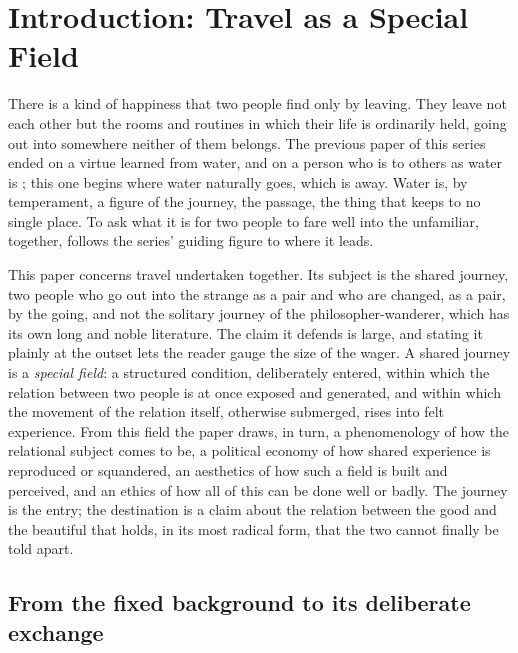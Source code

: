 \section{Introduction: Travel as a Special Field}
\label{p21:sec:intro}

\noindent
There is a kind of happiness that two people find only by leaving. They leave not each other but the rooms and routines in which their life is ordinarily held, going out into somewhere neither of them belongs. The previous paper of this series ended on a virtue learned from water, and on a person who is to others as water is \parencite{paperxx}; this one begins where water naturally goes, which is away. Water is, by temperament, a figure of the journey, the passage, the thing that keeps to no single place. To ask what it is for two people to fare well into the unfamiliar, together, follows the series' guiding figure to where it leads.

This paper concerns travel undertaken together. Its subject is the shared journey, two people who go out into the strange as a pair and who are changed, as a pair, by the going, and not the solitary journey of the philosopher-wanderer, which has its own long and noble literature. The claim it defends is large, and stating it plainly at the outset lets the reader gauge the size of the wager. A shared journey is a \emph{special field}: a structured condition, deliberately entered, within which the relation between two people is at once exposed and generated, and within which the movement of the relation itself, otherwise submerged, rises into felt experience. From this field the paper draws, in turn, a phenomenology of how the relational subject comes to be, a political economy of how shared experience is reproduced or squandered, an aesthetics of how such a field is built and perceived, and an ethics of how all of this can be done well or badly. The journey is the entry; the destination is a claim about the relation between the good and the beautiful that holds, in its most radical form, that the two cannot finally be told apart.

\subsection{From the fixed background to its deliberate exchange}
\label{p21:sub:intro-background}

